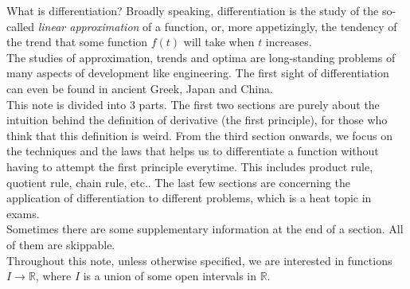 What is differentiation? Broadly speaking, differentiation is the study of the so-called \textit{linear approximation} of a function, or, more appetizingly, the tendency of the trend that some function $f(t)$ will take when $t$ increases.\\
The studies of approximation, trends and optima are long-standing problems of many aspects of development like engineering.
The first sight of differentiation can even be found in ancient Greek, Japan and China.\\
This note is divided into 3 parts.
The first two sections are purely about the intuition behind the definition of derivative (the first principle), for those who think that this definition is weird.
From the third section onwards, we focus on the techniques and the laws that helps us to differentiate a function without having to attempt the first principle everytime.
This includes product rule, quotient rule, chain rule, etc..
The last few sections are concerning the application of differentiation to different problems, which is a heat topic in exams.\\
Sometimes there are some supplementary information at the end of a section. All of them are skippable.\\
Throughout this note, unless otherwise specified, we are interested in functions $I\to\mathbb R$, where $I$ is a union of some open intervals in $\mathbb R$.